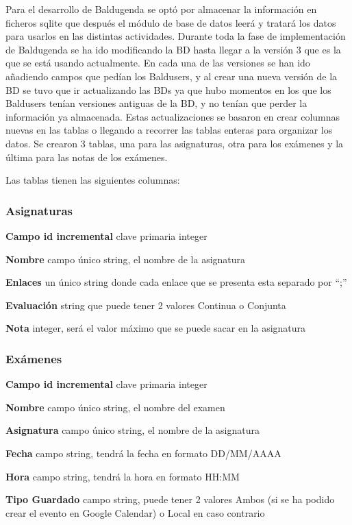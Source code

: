Para el desarrollo de Baldugenda se optó por almacenar la información en ficheros sqlite que después el módulo de base de datos leerá y tratará los datos para usarlos en las distintas actividades.
Durante toda la fase de implementación de Baldugenda se ha ido modificando la BD hasta llegar a la versión 3 que es la que se está usando actualmente.
En cada una de las versiones se han ido añadiendo campos que pedían los Baldusers, y al crear una nueva versión de la BD se tuvo que ir actualizando las BDs ya que hubo momentos en los que los Baldusers tenían versiones antiguas de la BD, y no tenían que perder la información ya almacenada.
Estas actualizaciones se basaron en crear columnas nuevas en las tablas o llegando a recorrer las tablas enteras para organizar los datos.
Se crearon 3 tablas, una para las asignaturas, otra para los exámenes y la última para las notas de los exámenes.


Las tablas tienen las siguientes columnas:
\subsubsection{Asignaturas}
\label{subsubsecc:Asignaturas}


\textbf{Campo id incremental} clave primaria integer

\textbf{Nombre} campo único string, el nombre de la asignatura

\textbf{Enlaces}   un único string donde cada enlace que se presenta esta separado por “;”

\textbf{Evaluación} string que puede tener 2 valores Continua o Conjunta

\textbf{Nota} integer, será el valor máximo que se puede sacar en la asignatura

\subsubsection{Exámenes}
\label{subsubsecc:Exámenes}


\textbf{Campo id incremental} clave primaria integer

\textbf{Nombre} campo único string, el nombre del examen

\textbf{Asignatura} campo único string, el nombre de la asignatura

\textbf{Fecha} campo string, tendrá la fecha en formato DD/MM/AAAA

\textbf{Hora} campo string, tendrá la hora en formato HH:MM

\textbf{Tipo Guardado} campo string, puede tener 2 valores Ambos (si se ha podido crear el evento en Google Calendar) o Local  en caso contrario

